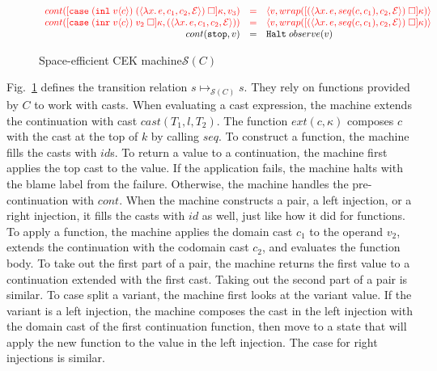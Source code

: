 \documentclass[acmsmall,review]{acmart}\settopmatter{printfolios=true,printccs=false,printacmref=false}
\newcommand{\figref}[1]{Fig.~\ref{#1}}
\newcommand{\funrule}[3]{#1 &=& #2 & #3\\}
\newcommand{\hifunrule}[3]{\highlight{#1} &\highlight{=}& \highlight{#2} & 
\highlight{#3}\\}
\newcommand{\sOOinspect}[3]{\langle#1,#2,#3\rangle}
\newcommand{\sOOreturn}[2]{\langle#1,#2\rangle}
\newcommand{\sOOhalt}[1]{\mathtt{Halt} \; #1}
\newcommand{\kOOmt}[0]{\mathtt{stop}}
\newcommand{\kOOappII}[2]{
  [#1 \; \square]#2}
\newcommand{\kOOcaseIII}[3]{
  [\mathtt{case} \; #1 \; #2 \; \square]#3}
\newcommand{\hcvOOfun}[5]{\langle \lambda #3.\, #4 , #1 , #5, #2 \rangle}
\newcommand{\hcvOOinl}[2]{\mathtt{inl}\;#1\langle#2\rangle}
\newcommand{\hcvOOinr}[2]{\mathtt{inr}\;#1\langle#2\rangle}
\newcommand{\hckOOmt}[0]{\mathtt{stop}}
\newcommand{\judgeSreduce}[3]{#2 \longmapsto_{\mathcal{S}(#1)} #3}
\newcommand{\judgeSreduceTrans}[3]{#2 \longmapsto_{\mathcal{S}(#1)}^{*} #3}
\newcommand{\judgeSeval}[3]{eval_{\mathcal{S}(#1)}(#2) = #3}
\newcommand{\continue}[2]{cont(#2,#1)}
\newcommand{\highlight}[1]{{\color{red} #1}}
\begin{document}
\begin{figure}
\[\begin{array}{rclr}
\hifunrule{
  \continue{v_3}{
    \kOOcaseIII{(\hcvOOinl{v}{c})}{(\hcvOOfun{c_1}{\mathcal{E}}{x}{e}{c_2})}{\kappa}
  }
}{
  \sOOreturn{v}{wrap(\kOOappII{(\hcvOOfun{seq(c,c_1)}{\mathcal{E}}{x}{e}{c_2})}{\kappa})}
}{}

\hifunrule{
  \continue{(\hcvOOfun{c_1}{\mathcal{E}}{x}{e}{c_2})}
  {
    \kOOcaseIII{(\hcvOOinr{v}{c})}{v_2}{\kappa}
  }
}{
  \sOOreturn{v}{wrap(\kOOappII{(\hcvOOfun{seq(c,c_1)}{\mathcal{E}}{x}{e}{c_2})}{\kappa})}
}{}

\funrule{
  \continue{v}{\kOOmt}}{
  \sOOhalt{observe(v)}}{}
  
  \end{array}\]
  
  
  
  \caption{Space-efficient CEK machine$\mathcal{S}(C)$}
  \label{fig:machine-cekcc}
\end{figure}

\figref{fig:machine-cekcc} defines the transition relation 
$\judgeSreduce{C}{s}{s}$. They rely on functions provided 
by $C$ to work with casts.
%
When evaluating a cast expression, the machine extends the continuation with 
cast $cast(T_1,l,T_2)$. The function $ext(c,\kappa)$ composes $c$ with the cast 
at the top of $k$ by calling $seq$.
%
To construct a function, the machine fills the casts with $id$s.
%
To return a value to a continuation, the machine first applies the top cast to 
the value. If the application fails, the machine halts with the blame label 
from the failure. Otherwise, the machine handles the pre-continuation with 
$cont$.
%
When the machine constructs a pair, a left injection, or a right injection, it 
fills the casts with $id$ as well, just like how it did for functions. 
%
To apply a function, the machine applies the domain cast $c_1$ to the 
operand $v_2$, extends the continuation with the codomain cast $c_2$, and 
evaluates the function body.
%
To take out the first part of a pair, the machine returns the first value to a 
continuation extended with the first cast. Taking out the second 
part of a pair is similar.
%
To case split a variant, the machine first looks at the variant value. If the 
variant is a left injection, the machine composes the cast in the left 
injection with the domain cast of the first continuation function, then move 
to a state that will apply the new function to the value in the left injection.
The case for right injections is similar.
\end{document}
